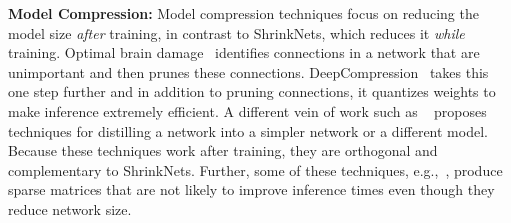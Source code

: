 


\noindent\textbf{Model Compression: }Model compression techniques focus on
reducing the model size \emph{after} training, in contrast to ShrinkNets, which
reduces it \emph{while} training. 
Optimal brain damage~\cite{Cun} identifies connections in a network that are
unimportant and then prunes these connections.
DeepCompression~\cite{han2015deepcompression} takes this one step further and in
addition to pruning connections, it quantizes weights to make inference
extremely efficient.  A different vein of work such as ~\cite{romero2014fitnets,
hinton2015distilling} proposes techniques for distilling a network into a
simpler network or a different model. Because these techniques work after
training, they are orthogonal and complementary to ShrinkNets. Further,
some of these techniques, e.g.,~\cite{Han2015,Cun}, produce sparse matrices that
are not likely to improve inference times even though they reduce network size.



